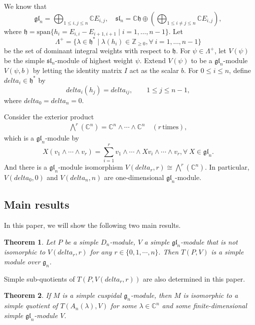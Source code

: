 \documentclass[12pt,a4paper]{amsart}
\def\mg{g}%
\def\gl{gl}%
\def\delta{delta}%
\newtheorem{theorem}{Theorem}[section]
\numberwithin{equation}{section}
\newcommand{\C}{\mathbb C}
\newcommand{\Z}{\mathbb{Z}}
\def\mg{\mathfrak{g}}
\def\mh{\mathfrak{h}}
\def\sl{\mathfrak{sl}}
\def\gl{\mathfrak{gl}}
\begin{document}

We know that
$$\gl_n=\bigoplus_{1\leq i,j\leq n}\C E_{i,j}, \quad \sl_n=\C\mh \oplus (\bigoplus_{1\leq i\neq j\leq n}\C E_{i,j}),$$
where $\mh=\text{span}\{h_i=E_{i,i}-E_{i+1,i+1}\mid i=1,\dots, n-1\}$. Let
$$\Lambda^{+}=\{\lambda\in \mh^* \mid \lambda(h_i)\in \Z_{\geq0}, \forall\ i=1,\dots, n-1\}$$
be the set of dominant integral weights with respect to \(\mh\). For
\(\psi\in\Lambda^+\), let \(V(\psi)\) be the simple
\(\sl_n\)-module of highest weight \(\psi\). Extend
\(V(\psi)\) to be a
\(\gl_n\)-module \(V(\psi,b)\) by letting the identity matrix $I$ act as
the scalar \(b\). For \(0\leq i\leq n\), define
\(\delta_i\in\mh^*\) by
\[
\delta_i(h_j)=\delta_{ij},\qquad 1\leq j\leq n-1,
\]
where \(\delta_0=\delta_n=0\).

Consider the exterior product
\begin{align*}
\bigwedge^{r}(\C^n)=\C^n\wedge \cdots \wedge \C^n \quad (r \, \text{times}),
\end{align*}
which is a $\gl_n$-module by
$$X(v_1\wedge\cdots \wedge v_r)=\sum^r_{i=1}v_1\wedge \cdots \wedge Xv_i\wedge \cdots \wedge v_r, \forall\ X\in \gl_n.$$
And there is a $\gl_n$-module isomorphism $V(\delta_r,r)\cong \bigwedge^{r}(\C^n)$. In particular, $V(\delta_0,0)$ and $V(\delta_n,n)$ are one-dimensional $\gl_n$-module.



\subsection{Main results}


In this paper, we will show the following two main results.

\begin{theorem}
Let $P$ be a simple $D_n$-module,  $V$  a simple $\gl_n$-module that is not isomorphic to $V(\delta_r,r)$ for any $r\in \{0, 1,\cdots, n\}$. Then $T(P, V)$ is a simple module over $\mg_n$.
\end{theorem}

Simple sub-quotients of $T(P, V(\delta_r,r))$ are also
determined in this paper.


\begin{theorem}\label{thm:main-classification}
If \(M\) is a simple cuspidal \(\mg_n\)-module, then \(M\) is
isomorphic to a simple quotient of \(T(A_n(\lambda),V)\) for some
\(\lambda\in\C^n\) and some finite-dimensional simple
\(\gl_n\)-module \(V\).
\end{theorem}
\end{document}
